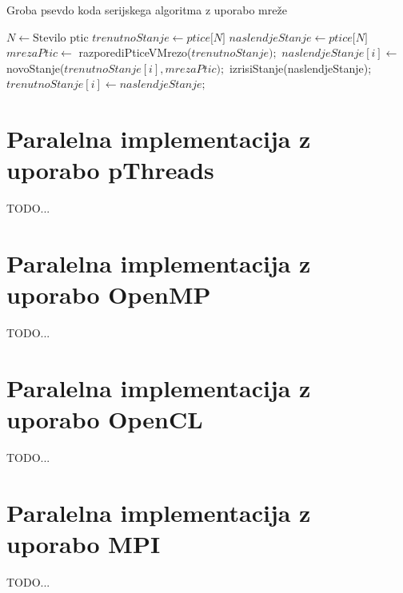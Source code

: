 \documentclass[a4paper, 12pt]{book}
\begin{document}

\begin{algorithm}
\caption{Groba psevdo koda serijskega algoritma z uporabo mreže}\label{serial_grid_pseudo_code}
\begin{algorithmic}[1]
\State $N \gets \text{Stevilo ptic}$
\State $trenutnoStanje \gets \textit{ptice[N]}$
\State $naslendjeStanje \gets \textit{ptice[N]}$
\Loop
\State $mrezaPtic \gets$ razporediPticeVMrezo($trenutnoStanje);$
\State $naslendjeStanje[i] \gets$ novoStanje($trenutnoStanje[i], mrezaPtic);$
\EndFor
\State izrisiStanje(naslendjeStanje);
\State $trenutnoStanje[i] \gets naslendjeStanje;$
\EndLoop
\end{algorithmic}
\end{algorithm}

\chapter{Paralelna implementacija z uporabo pThreads}
\label{ch2}
TODO...

\chapter{Paralelna implementacija z uporabo OpenMP}
\label{ch3}
TODO...

\chapter{Paralelna implementacija z uporabo OpenCL}
\label{ch4}
TODO...

\chapter{Paralelna implementacija z uporabo MPI}
\label{ch5}
TODO...


\newpage
\ \\
\clearpage
{}


\end{document}
